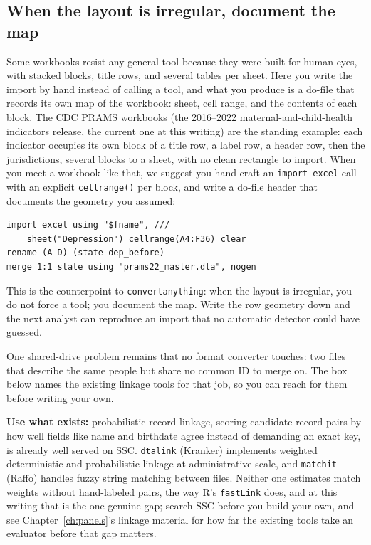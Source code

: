 \subsection{When the layout is irregular, document the map}\label{sec:ch04-irregular}
Some workbooks resist any general tool because they were built for human eyes, with stacked blocks, title rows, and several tables per sheet. Here you write the import by hand instead of calling a tool, and what you produce is a do-file that records its own map of the workbook: sheet, cell range, and the contents of each block. The CDC PRAMS workbooks (the 2016--2022 maternal-and-child-health indicators release, the current one at this writing) are the standing example: each indicator occupies its own block of a title row, a label row, a header row, then the jurisdictions, several blocks to a sheet, with no clean rectangle to import. When you meet a workbook like that, we suggest you hand-craft an \texttt{import excel} call with an explicit \texttt{cellrange()} per block, and write a do-file header that documents the geometry you assumed:
\par
{\footnotesize
\begin{verbatim}
import excel using "$fname", ///
    sheet("Depression") cellrange(A4:F36) clear
rename (A D) (state dep_before)
merge 1:1 state using "prams22_master.dta", nogen
\end{verbatim}
}
This is the counterpoint to \texttt{convertanything}: when the layout is irregular, you do not force a tool; you document the map. Write the row geometry down and the next analyst can reproduce an import that no automatic detector could have guessed.

One shared-drive problem remains that no format converter touches: two files that describe the same people but share no common ID to merge on. The box below names the existing linkage tools for that job, so you can reach for them before writing your own.

\begin{kaobox}[frametitle=Existing tools: probabilistic linkage with \texttt{dtalink} and \texttt{matchit}]
\textbf{Use what exists:} probabilistic record linkage, scoring candidate record pairs by how well fields like name and birthdate agree instead of demanding an exact key, is already well served on SSC. \texttt{dtalink} (Kranker) implements weighted deterministic and probabilistic linkage at administrative scale, and \texttt{matchit} (Raffo) handles fuzzy string matching between files. Neither one estimates match weights without hand-labeled pairs, the way R's \texttt{fastLink} does, and at this writing that is the one genuine gap; search SSC before you build your own, and see Chapter~\ref{ch:panels}'s linkage material for how far the existing tools take an evaluator before that gap matters.
\end{kaobox}

